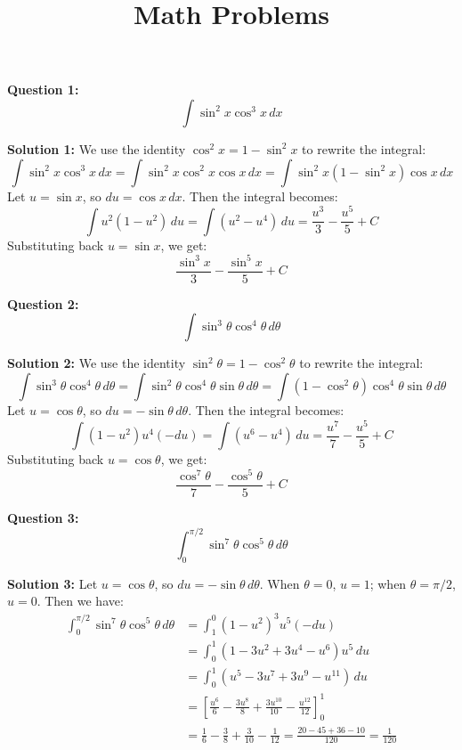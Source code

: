 \documentclass{article}
\title{Math Problems}
\author{}
\date{}
\begin{document}
\maketitle

\textbf{Question 1:}
\[ \int \sin^2 x \cos^3 x \, dx \]

\textbf{Solution 1:}
\textcolor[rgb]{1.000, 0.000, 0.000}{We use the identity $\cos^2 x = 1 - \sin^2 x$ to rewrite the integral:
\[ \int \sin^2 x \cos^3 x \, dx = \int \sin^2 x \cos^2 x \cos x \, dx = \int \sin^2 x (1 - \sin^2 x) \cos x \, dx \]
Let $u = \sin x$, so $du = \cos x \, dx$. Then the integral becomes:
\[ \int u^2 (1 - u^2) \, du = \int (u^2 - u^4) \, du = \frac{u^3}{3} - \frac{u^5}{5} + C \]
Substituting back $u = \sin x$, we get:
\[ \frac{\sin^3 x}{3} - \frac{\sin^5 x}{5} + C \]}

\bigskip

\textbf{Question 2:}
\[ \int \sin^3 \theta \cos^4 \theta \, d\theta \]

\textbf{Solution 2:}
\textcolor[rgb]{1.000, 0.000, 0.000}{We use the identity $\sin^2 \theta = 1 - \cos^2 \theta$ to rewrite the integral:
\[ \int \sin^3 \theta \cos^4 \theta \, d\theta = \int \sin^2 \theta \cos^4 \theta \sin \theta \, d\theta = \int (1 - \cos^2 \theta) \cos^4 \theta \sin \theta \, d\theta \]
Let $u = \cos \theta$, so $du = -\sin \theta \, d\theta$. Then the integral becomes:
\[ \int (1 - u^2) u^4 (-du) = \int (u^6 - u^4) \, du = \frac{u^7}{7} - \frac{u^5}{5} + C \]
Substituting back $u = \cos \theta$, we get:
\[ \frac{\cos^7 \theta}{7} - \frac{\cos^5 \theta}{5} + C \]}

\bigskip

\textbf{Question 3:}
\[ \int_0^{\pi/2} \sin^7 \theta \cos^5 \theta \, d\theta \]

\textbf{Solution 3:}
\textcolor[rgb]{1.000, 0.000, 0.000}{Let $u = \cos \theta$, so $du = -\sin \theta \, d\theta$. When $\theta = 0$, $u = 1$; when $\theta = \pi/2$, $u = 0$.  Then we have:
\begin{align*} \int_0^{\pi/2} \sin^7 \theta \cos^5 \theta \, d\theta &= \int_1^0 (1 - u^2)^3 u^5 (-du) \\ &= \int_0^1 (1 - 3u^2 + 3u^4 - u^6) u^5 \, du \\ &= \int_0^1 (u^5 - 3u^7 + 3u^9 - u^{11}) \, du \\ &= \left[ \frac{u^6}{6} - \frac{3u^8}{8} + \frac{3u^{10}}{10} - \frac{u^{12}}{12} \right]_0^1 \\ &= \frac{1}{6} - \frac{3}{8} + \frac{3}{10} - \frac{1}{12} = \frac{20 - 45 + 36 - 10}{120} = \frac{1}{120} \end{align*} }
\end{document}
